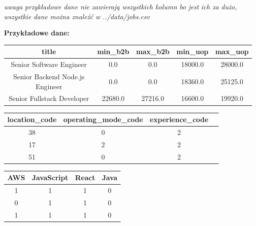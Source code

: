 \documentclass{article}
\begin{document}
\textit{uwaga przykładowe dane nie zawierają wszystkich kolumn bo jest ich za dużo, wszystkie dane można znaleźć w ../data/jobs.csv}


\textbf{Przykładowe dane:}


\begin{table}[h]
    \centering
    \begin{tabular}{|c|c|c|c|c|}
        \hline
        \multicolumn{1}{|c|}{\textbf{title}} & \textbf{min\_b2b} & \textbf{max\_b2b} & \textbf{min\_uop} & \textbf{max\_uop} \\ \hline
        Senior Software Engineer             & 0.0               & 0.0               & 18000.0           & 28000.0           \\ \hline
        Senior Backend Node.js Engineer      & 0.0               & 0.0               & 18360.0           & 25125.0           \\ \hline
        Senior Fullstack Developer           & 22680.0           & 27216.0           & 16600.0           & 19920.0           \\ \hline
    \end{tabular}
\end{table}


\begin{table}[h]
    \centering
    \begin{tabular}{|c|c|c|c|}
        \hline
        \textbf{location\_code} & \textbf{operating\_mode\_code} & \textbf{experience\_code} \\ \hline
        38                      & 0                              & 2                         \\ \hline
        17                      & 2                              & 2                         \\ \hline
        51                      & 0                              & 2                         \\ \hline
    \end{tabular}
\end{table}


\begin{table}[h]
    \centering
    \begin{tabular}{|c|c|c|c|}
        \hline
        \textbf{AWS} & \textbf{JavaScript} & \textbf{React} & \textbf{Java} \\ \hline
        1            & 1                   & 1              & 0             \\ \hline
        0            & 1                   & 1              & 0             \\ \hline
        1            & 1                   & 1              & 0             \\ \hline
    \end{tabular}
\end{table}
\end{document}
